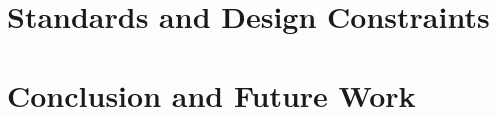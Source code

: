 \documentclass[12pt]{report}
\begin{document}
\chapter{Standards and Design Constraints}
\label{cha:AccreditationComponents}


\chapter{Conclusion and Future Work}
\label{cha:ConclusionAndFutureWork}





\appendix

\end{document}
